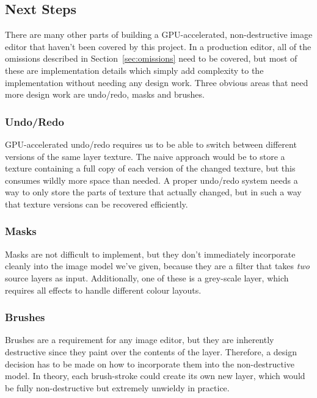 \documentclass[12pt]{article}
\begin{document}
\subsection{Next Steps}\label{sec:next-steps}

There are many other parts of building a GPU-accelerated, non-destructive image editor that
haven't been covered by this project.  In a production editor, all of the omissions described in
Section~\ref{sec:omissions} need to be covered, but most of these are implementation details which
simply add complexity to the implementation without needing any design work.  Three obvious areas
that need more design work are undo/redo, masks and brushes.

\subsubsection{Undo/Redo}

GPU-accelerated undo/redo requires us to be able to switch between different versions of the same
layer texture.  The naive approach would be to store a texture containing a full copy of each
version of the changed texture, but this consumes wildly more space than needed.  A proper undo/redo
system needs a way to only store the parts of texture that actually changed, but in such a way that
texture versions can be recovered efficiently.

\subsubsection{Masks}

Masks are not difficult to implement, but they don't immediately incorporate cleanly into the image
model we've given, because they are a filter that takes \emph{two} source layers as input.
Additionally, one of these is a grey-scale layer, which requires all effects to handle different
colour layouts.

\subsubsection{Brushes}

Brushes are a requirement for any image editor, but they are inherently destructive since they
paint over the contents of the layer.  Therefore, a design decision has to be made on how to
incorporate them into the non-destructive model.  In theory, each brush-stroke could create its own
new layer, which would be fully non-destructive but extremely unwieldy in practice.
\end{document}
